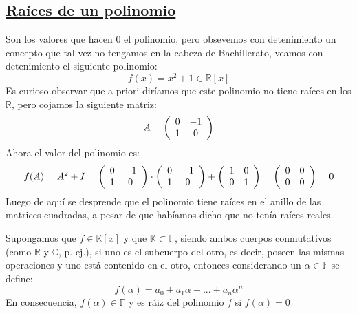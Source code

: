 \documentclass[10pt,a4paper,openright]{book}
\begin{document}
\subsection*{\underline{Raíces de un polinomio}}
Son los valores que hacen 0 el polinomio, pero obsevemos con detenimiento un concepto que tal vez no tengamos en la cabeza de Bachillerato, veamos con detenimiento el siguiente polinomio:
$$f(x)=x^2+1\in \mathbb R[x]$$
Es curioso observar que a priori diríamos que este polinomio no tiene raíces en los $\mathbb R$, pero cojamos la siguiente matriz:
$$A=\left( 
\begin{array}{*2c}
0 & -1 \\
1 & 0 \\
\end{array}
\right)
$$
Ahora el valor del polinomio es:
$$f(A)=A^2+I=\left(\begin{array}{*2c}0 & -1 \\ 1 & 0 \\ \end{array}\right)\cdot \left(\begin{array}{*2c}0 & -1 \\ 1 & 0 \\ \end{array}\right) + \left(\begin{array}{*2c}1 & 0 \\ 0 & 1 \\ \end{array}\right)= \left(\begin{array}{*2c}0 & 0 \\ 0 & 0 \\ \end{array}\right)=0$$
Luego de aquí se desprende que el polinomio tiene raíces en el anillo de las matrices cuadradas, a pesar de que habíamos dicho que no tenía raíces reales.\par
Supongamos que $f\in\mathbb K[x]$ y que $\mathbb K \subset \mathbb F$, siendo ambos cuerpos conmutativos (como $\mathbb R$ y $\mathbb C$, p. ej.), si uno es el subcuerpo del otro, es decir, poseen las mismas operaciones y uno está contenido en el otro, entonces considerando un $\alpha\in \mathbb F$ se define:
$$f(\alpha)=a_0+a_1\alpha+...+a_n\alpha^n$$
En consecuencia, $f(\alpha)\in \mathbb F$ y es ráiz del polinomio $f$ si $f(\alpha)=0$
\end{document}
